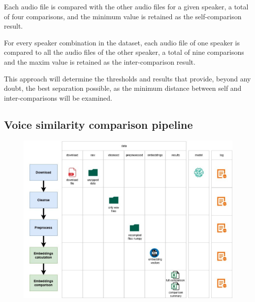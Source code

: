 \documentclass[conference]{IEEEtran}
\begin{document}
Each audio file is compared with the other audio files for a given speaker, a total of four comparisons, and the minimum value is retained as the self-comparison result.

For every speaker combination in the dataset, each audio file of one speaker is compared to all the audio files of the other speaker, a total of nine comparisons and the maxim value is retained as the inter-comparison result.

This approach will determine the thresholds and results that provide, beyond any doubt, the best separation possible, as the minimum distance between self and inter-comparisons will be examined.



\subsection{Voice similarity comparison pipeline}

\begin{figure}[H]
	\centering
	\includegraphics[width=1\linewidth]{img/img-pipeline}
	\caption{}
	\label{fig:img-pipeline}
\end{figure}
\end{document}
